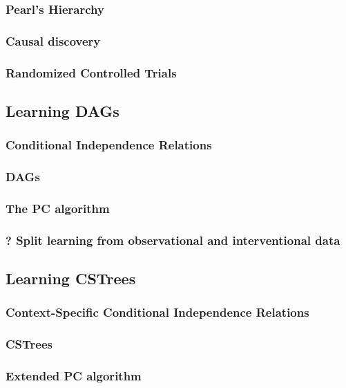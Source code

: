 \documentclass[11pt]{article}
\begin{document}
\subsubsection{Pearl's Hierarchy}
\label{sec:org046d640}
\subsubsection{Causal discovery}
\label{sec:orgc81d120}
\subsubsection{Randomized Controlled Trials}
\label{sec:org3aad5dd}
\subsection{Learning DAGs}
\label{sec:org9712cb4}
\subsubsection{Conditional Independence Relations}
\label{sec:org14398fe}
\subsubsection{DAGs}
\label{sec:orgf9dcd54}
\subsubsection{The PC algorithm}
\label{sec:org5e287c0}
\subsubsection{? Split learning from observational and interventional data}
\label{sec:org9872495}
\subsection{Learning CSTrees}
\label{sec:org68cc0e2}
\subsubsection{Context-Specific Conditional Independence Relations}
\label{sec:org4c9f42a}
\subsubsection{CSTrees}
\label{sec:org6625070}
\subsubsection{Extended PC algorithm}
\label{sec:org76013fd}
\end{document}
